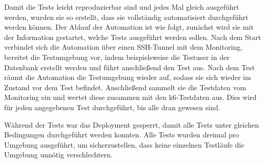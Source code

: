 Damit die Tests leicht reproduzierbar sind und jedes Mal gleich ausgeführt werden, wurden sie so erstellt, dass sie vollständig automatisiert durchgeführt werden können.
Der Ablauf der Automation ist wie folgt, zunächst wird sie mit der Information gestartet, welche Tests ausgeführt werden sollen. 
Nach dem Start verbindet sich die Automation über einen SSH-Tunnel mit dem Monitoring, bereitet die Testumgebung vor, indem beispielsweise die Testuser in der Datenbank erstellt werden und führt anschließend den Test aus.
Nach dem Test räumt die Automation die Testumgebung wieder auf, sodass sie sich wieder im Zustand vor dem Test befindet. Anschließend sammelt sie die Testdaten vom Monitoring ein und wertet diese zusammen mit den k6-Testdaten aus.
Dies wird für jeden angegebenen Test durchgeführt, bis alle dran gewesen sind.

Während der Tests war das Deployment gesperrt, damit alle Tests unter gleichen Bedingungen durchgeführt werden konnten.
Alle Tests wurden dreimal pro Umgebung ausgeführt, um sicherzustellen, dass keine einzelnen Testläufe die Umgebung unnötig verschlechtern.